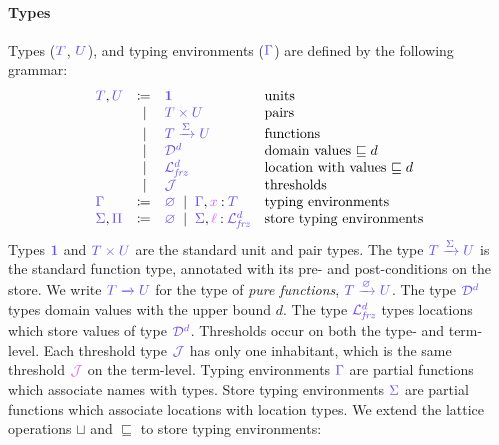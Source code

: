 \documentclass[main.tex]{subfiles}
\begin{document}
\paragraph*{Types}
Types ($\ty{T}$, $\ty{U}$),  and typing environments ($\ty{\Gamma}$) are defined by the following grammar:
\[
\begin{array}{lrll}
  \ty{T}, \ty{U}
  & \coloneqq & \ty{\tyunit}                              & \text{units}\\
  & \sep      & \ty{\typrod{T}{U}}                        & \text{pairs}\\
  & \sep      & \ty{\tyfun[\ty{\Sigma}]{T}{U}}            & \text{functions}\\
  & \sep      & \ty{\tyD{d}}                              & \text{domain values }{\sqsubseteq d}\\
  & \sep      & \ty{\tyL{\frz}{d}}                        & \text{location with values }{\sqsubseteq d}\\
  & \sep      & \ty{\tyJ}                                 & \text{thresholds}
  \\
  \ty{\Gamma}
  & \coloneqq & \ty{\envemp}
    \sep        \envext{\ty{\Gamma}}{x}{T}                & \text{typing environments}
  \\
  \ty{\Sigma},\ty{\Pi}
  & \coloneqq & \ty{\envemp}
    \sep        \envext{\ty{\Sigma}}{\ell}{\tyL{\frz}{d}} & \text{store typing environments}
\end{array}
\]
Types $\ty{\tyunit}$ and $\ty{\typrod{T}{U}}$ are the standard unit and pair types.
The type $\ty{\tyfun[\ty{\Sigma}]{T}{U}}$ is the standard function type, annotated with its pre- and post-conditions on the store. We write $\ty{\tyfun{T}{U}}$ for the type of \emph{pure functions}, \ie $\ty{\tyfun[\envemp]{T}{U}}$.
The type $\tyD{d}$ types domain values with the upper bound $d$.
The type $\tyL{\frz}{d}$ types locations which store values of type $\tyD{d}$.
Thresholds occur on both the type- and term-level. Each threshold type $\tyJ$ has only one inhabitant, which is the same threshold $\tmJ$ on the term-level.
Typing environments $\ty{\Gamma}$ are partial functions which associate names with types.
Store typing environments $\ty{\Sigma}$ are partial functions which associate locations with location types.
We extend the lattice operations $\sqcup$ and $\sqsubseteq$ to store typing environments:
\end{document}

